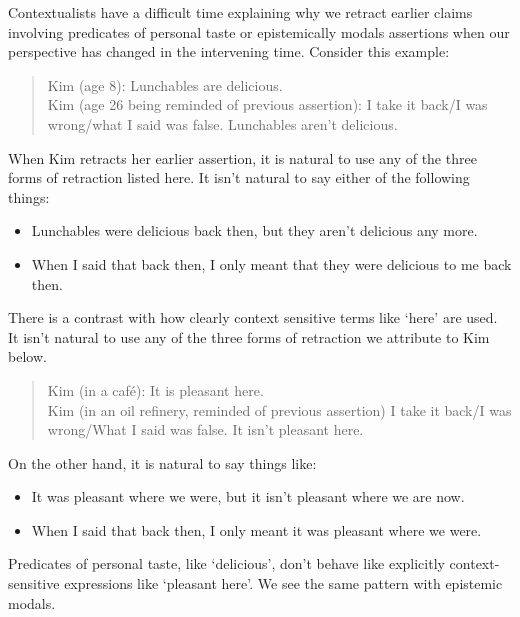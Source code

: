 Contextualists have a difficult time explaining why we retract earlier claims involving predicates of personal taste or epistemically modals assertions when our perspective has changed in the intervening time. Consider this example:

\begin{quote}

Kim (age 8): Lunchables are delicious.\\
Kim (age 26 being reminded of previous assertion): I take it back\slash  I was wrong\slash  what I said was false. Lunchables aren’t delicious.
\end{quote}
When Kim retracts her earlier assertion, it is natural to use any of the three forms of retraction listed here. It isn't natural to say either of the following things:

\begin{itemize}
\item Lunchables were delicious back then, but they aren’t delicious any more.

\item When I said that back then, I only meant that they were delicious to me back then.

\end{itemize}
There is a contrast with how clearly context sensitive terms like `here' are used. It isn't natural to use any of the three forms of retraction we attribute to Kim below.

\begin{quote}

Kim (in a café): It is pleasant here.\\
Kim (in an oil refinery, reminded of previous assertion) I take it back\slash  I was wrong\slash  What I said was false. It isn't pleasant here.
\end{quote}
On the other hand, it is natural to say things like:

\begin{itemize}
\item It was pleasant where we were, but it isn't pleasant where we are now.

\item When I said that back then, I only meant it was pleasant where we were.

\end{itemize}
Predicates of personal taste, like `delicious', don't behave like explicitly context-sensitive expressions like `pleasant here'. We see the same pattern with epistemic modals.

